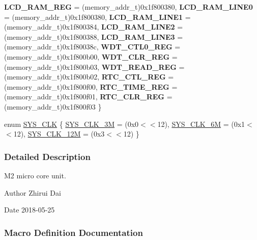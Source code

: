 \begin{DoxyCompactItemize}
{\bfseries L\+C\+D\+\_\+\+R\+A\+M\+\_\+\+R\+EG} = (memory\+\_\+addr\+\_\+t)0x1f800380, 
{\bfseries L\+C\+D\+\_\+\+R\+A\+M\+\_\+\+L\+I\+N\+E0} = (memory\+\_\+addr\+\_\+t)0x1f800380, 
{\bfseries L\+C\+D\+\_\+\+R\+A\+M\+\_\+\+L\+I\+N\+E1} = (memory\+\_\+addr\+\_\+t)0x1f800384, 
{\bfseries L\+C\+D\+\_\+\+R\+A\+M\+\_\+\+L\+I\+N\+E2} = (memory\+\_\+addr\+\_\+t)0x1f800388, 
{\bfseries L\+C\+D\+\_\+\+R\+A\+M\+\_\+\+L\+I\+N\+E3} = (memory\+\_\+addr\+\_\+t)0x1f80038c, 
{\bfseries W\+D\+T\+\_\+\+C\+T\+L0\+\_\+\+R\+EG} = (memory\+\_\+addr\+\_\+t)0x1f800b00, 
{\bfseries W\+D\+T\+\_\+\+C\+L\+R\+\_\+\+R\+EG} = (memory\+\_\+addr\+\_\+t)0x1f800b03, 
{\bfseries W\+D\+T\+\_\+\+R\+E\+A\+D\+\_\+\+R\+EG} = (memory\+\_\+addr\+\_\+t)0x1f800b02, 
{\bfseries R\+T\+C\+\_\+\+C\+T\+L\+\_\+\+R\+EG} = (memory\+\_\+addr\+\_\+t)0x1f800f00, 
{\bfseries R\+T\+C\+\_\+\+T\+I\+M\+E\+\_\+\+R\+EG} = (memory\+\_\+addr\+\_\+t)0x1f800f01, 
{\bfseries R\+T\+C\+\_\+\+C\+L\+R\+\_\+\+R\+EG} = (memory\+\_\+addr\+\_\+t)0x1f800f03
 \}
\item 
enum \mbox{\hyperlink{a00020_ae3a2d501b8662e11b969fb4a5e195e5b}{S\+Y\+S\+\_\+\+C\+LK}} \{ \mbox{\hyperlink{a00020_ae3a2d501b8662e11b969fb4a5e195e5baaac7754daa9ff2db35951f3539495122}{S\+Y\+S\+\_\+\+C\+L\+K\+\_\+3M}} = (0x0$<$$<$12), 
\mbox{\hyperlink{a00020_ae3a2d501b8662e11b969fb4a5e195e5bad1640aa8c46162a7551abca12293ef39}{S\+Y\+S\+\_\+\+C\+L\+K\+\_\+6M}} = (0x1$<$$<$12), 
\mbox{\hyperlink{a00020_ae3a2d501b8662e11b969fb4a5e195e5ba6c646c9a1e4c38ef0af6d576eacfb401}{S\+Y\+S\+\_\+\+C\+L\+K\+\_\+12M}} = (0x3$<$$<$12)
 \}
\end{DoxyCompactItemize}


\subsubsection{Detailed Description}
M2 micro core unit. 

\begin{DoxyAuthor}{Author}
Zhirui Dai 
\end{DoxyAuthor}
\begin{DoxyDate}{Date}
2018-\/05-\/25 
\end{DoxyDate}


\subsubsection{Macro Definition Documentation}
\mbox{\label{a00020_ad87cedffcaadc51db22594fce55173d4}} 
